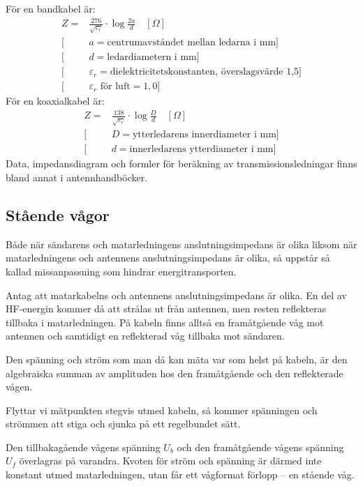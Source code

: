 \noindent
För en bandkabel är:
\begin{align*}
Z = & \frac{276}{\sqrt{\varepsilon_r}}\cdot\log\frac{2a}{d} \quad [\Omega] \\
[&a = \text{centrumavståndet mellan ledarna i mm}] \\
[&d = \text{ledardiametern i mm}] \\
[&\varepsilon_r = \text{dielektricitetskonstanten, överslagsvärde 1,5}] \\
[&\varepsilon_r \text{ för luft} = 1,0]
\end{align*}
För en koaxialkabel är:
\begin{align*}
Z = & \frac{138}{\sqrt{\varepsilon_r}}\cdot\log\frac{D}{d} \quad [\Omega] \\
[&D = \text{ytterledarens innerdiameter i mm}] \\
[&d = \text{innerledarens ytterdiameter i mm}]
\end{align*}
Data, impedansdiagram och formler för beräkning av transmissionsledningar
finns bland annat i antennhandböcker.

\subsection{Stående vågor}
\label{stående_vågor}

Både när sändarens och matarledningens anslutningsimpedans är olika
liksom när matarledningens och antennens anslutningsimpedans är olika,
så uppstår så kallad missanpassning som hindrar energitransporten.

Antag att matarkabelns och antennens anslutningsimpedans är olika.
En del av HF-energin kommer då att strålas ut från antennen, men resten
reflekteras tillbaka i matarledningen.
På kabeln finns alltså en framåtgående våg mot antennen och samtidigt en
reflekterad våg tillbaka mot sändaren.

Den spänning och ström som man då kan mäta var som helst på kabeln, är den
algebraiska summan av amplituden hos den framåtgående och den reflekterade
vågen.

Flyttar vi mätpunkten stegvis utmed kabeln, så kommer spänningen och
strömmen att stiga och sjunka på ett regelbundet sätt.

Den tillbakagående vågens spänning \(U_b\) och den framåtgående vågens
spänning \(U_f\) överlagras på varandra.
Kvoten för ström och spänning är därmed inte konstant utmed matarledningen,
utan får ett vågformat förlopp -- en stående våg.

